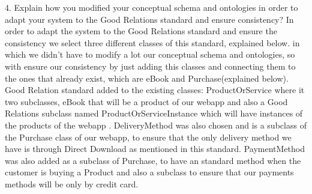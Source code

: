 4. Explain how you modiﬁed your conceptual schema and ontologies in order to adapt your system to the Good Relations standard and ensure consistency?
In order to adapt the system to the Good Relations standard and ensure the consistency we select three different classes of this standard, explained below. in which we didn’t have to modify a lot our conceptual schema and ontologies, so with ensure our consistency by just adding this classes and connecting them to the ones that already exist, which are eBook and Purchase(explained below).
Good Relation standard added to the existing classes:
ProductOrService where it two subclasses, eBook that will be a product of our webapp and also a Good Relations subclass named ProductOrServiceInstance which will have instances of the products of the webapp .
DeliveryMethod was also chosen and is a subclass of the Purchase class of our webapp, to ensure that the only delivery method we have is through Direct Download as mentioned in this standard.
PaymentMethod was also added as a subclass of Purchase, to have an standard method when the customer is buying a Product and also a subclass to ensure that our payments methods will be only by credit card.
